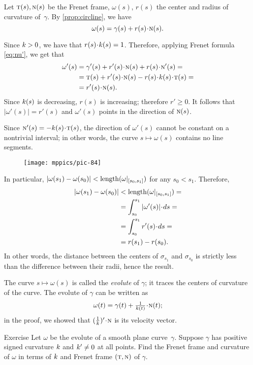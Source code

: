 Let $\text{\sc{t}}(s),\text{\sc{n}}(s)$ be the Frenet frame,
$\omega(s)$, $r(s)$
the center and radius of curvature of~$\gamma$.
By \ref{prop:circline},  we have
\[\omega(s)=\gamma(s)+r(s)\cdot \norm(s).\]

Since $k>0$, we have that $r(s)\cdot\skur(s)=1$.
Therefore, applying Frenet formula \ref{eq:nu'}, we get that
\begin{align*}
\omega'(s)&=\gamma'(s)+r'(s)\cdot \norm(s)+r(s)\cdot \norm'(s)=
\\
&=\tan(s)+r'(s)\cdot \norm(s)-r(s)\cdot \skur(s)\cdot \tan(s)=
\\
&=r'(s)\cdot \norm(s).
\end{align*}
Since $k(s)$ is decreasing, $r(s)$ is increasing;
therefore $r'\ge 0$.
It follows that $|\omega'(s)|= r'(s)$ and $\omega'(s)$ points in the direction of $\text{\sc{n}}(s)$.

Since $\norm'(s)=-\skur(s)\cdot\tan(s)$, the direction of $\omega'(s)$ cannot be constant on a nontrivial interval;
in other words, the curve $s\mapsto \omega(s)$ contains no line segments.

\begin{wrapfigure}[5]{o}{35 mm}
\vskip-0mm
\centering
\texttt{[image: mppics/pic-84]}
\end{wrapfigure}

In particular, $|\omega(s_1)-\omega(s_0)|\z<\length(\omega|_{[s_0,s_1]})$ for any $s_0<s_1$.
Therefore, 
\begin{align*}
|\omega(s_1)-\omega(s_0)|&<\length(\omega|_{[s_0,s_1]})=
\\
&=\int_{s_0}^{s_1}|\omega'(s)|\cdot ds=
\\
&=\int_{s_0}^{s_1}r'(s)\cdot ds=
\\
&=r(s_1)-r(s_0).
\end{align*}
In other words, the distance between the centers of $\sigma_{s_1}$ and $\sigma_{s_0}$
is strictly less than the difference between their radii, hence the result.
\qeds


The curve $s\mapsto \omega(s)$ is called the \emph{evolute} of $\gamma$; 
it traces the centers of curvature of the curve. 
The evolute of $\gamma$ can be written as 
\[\omega(t)=\gamma(t)+\tfrac1{\skur(t)}\cdot \norm(t);\] 
in the proof, we showed that $(\tfrac1{\skur})'\cdot\norm$ is its velocity vector.


\begin{thm}{Exercise}\label{ex:evolute}
Let $\omega$ be the evolute of a smooth plane curve~$\gamma$.
Suppose $\gamma$ has positive signed curvature $k$ and $k' \neq 0$ at all points.
Find the Frenet frame and curvature of \(\omega\) in terms of $k$ and Frenet frame $(\text{\sc{t}},\text{\sc{n}})$ of $\gamma$.
\end{thm}

